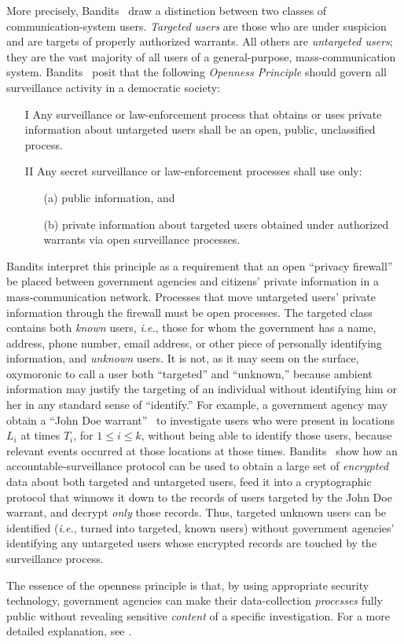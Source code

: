 More precisely, Bandits~\cite{sff-foci2014} draw a distinction 
between two classes of communication-system users.  {\it Targeted users} are 
those who are under suspicion and are targets of properly authorized warrants.
All others are {\it untargeted users}; they are the vast majority of all 
users of a general-purpose, mass-communication system. Bandits~\cite{sff-foci2014}
posit that the following {\it Openness Principle} should govern all surveillance
activity in a democratic society:
\begin{enumerate}
\item[I]
Any surveillance or law-enforcement process
that obtains or uses private information
about untargeted users shall be
an open, public, unclassified process.
\item[II]
Any secret surveillance or law-enforcement processes shall use only:
\begin{enumerate}
\item[(a)] public information, and
\item[(b)] private information about targeted users obtained under 
authorized warrants via open surveillance processes.
\end{enumerate}
\end{enumerate}
Bandits interpret this principle as a requirement that an open
``privacy firewall'' be placed between government agencies and citizens'
private information in a mass-communication network.  Processes that move
untargeted users' private information through the firewall must be open
processes.  The targeted class contains both {\it known} users, {\it i.e.},
those for whom the government has a name, address, phone number, email address,
or other piece of personally identifying information, and {\it unknown} users.
It is not, as it may seem on the surface, oxymoronic to call a user both
``targeted'' and ``unknown,'' because ambient information may justify the
targeting of an individual without identifying him or her in any standard sense
of ``identify.''  For example, a government agency may obtain a ``John Doe
warrant''~\cite{bieber-penn2002} to investigate users who were present in
locations $L_i$ at times $T_i$, for $1\leq i\leq k$, without being able to 
identify those users, because relevant events occurred at those locations at
those times. Bandits~\cite{sff-foci2014} show how an 
accountable-surveillance protocol can be used to obtain a large set of
{\it encrypted} data about both targeted and untargeted users, feed it into a 
cryptographic protocol that winnows it down to the records of users targeted by
the John Doe warrant, and decrypt {\it only} those records.  Thus, targeted
unknown users can be identified ({\it i.e.}, turned into targeted, known users)
without government agencies' identifying any untargeted users whose 
encrypted records are touched by the surveillance process.

The essence of the openness principle is that, by using
appropriate security technology, government agencies can make their 
data-collection {\it processes} fully public without revealing sensitive
{\it content} of a specific investigation.  For a more detailed explanation,
see \cite[Section 2]{sff-foci2014}.

